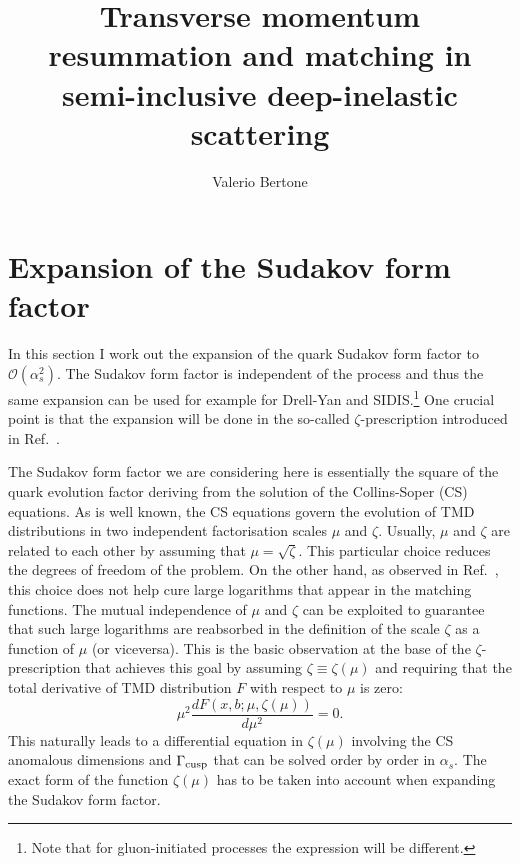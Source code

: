 \documentclass[10pt,a4paper]{article}
\begin{document}
\title{Transverse momentum resummation and matching in semi-inclusive
  deep-inelastic scattering}

\author{Valerio Bertone}

\maketitle

\printindex

\section{Expansion of the Sudakov form factor}

In this section I work out the expansion of the quark Sudakov form
factor to $\mathcal{O}(\alpha_s^2)$. The Sudakov form factor is
independent of the process and thus the same expansion can be used for
example for Drell-Yan and SIDIS.\footnote{Note that for
  gluon-initiated processes the expression will be different.} One
crucial point is that the expansion will be done in the so-called
$\zeta$-prescription introduced in Ref.~\cite{Scimemi:2017etj}.

The Sudakov form factor we are considering here is essentially the
square of the quark evolution factor deriving from the solution of the
Collins-Soper (CS) equations. As is well known, the CS equations
govern the evolution of TMD distributions in two independent
factorisation scales $\mu$ and $\zeta$. Usually, $\mu$ and $\zeta$ are
related to each other by assuming that $\mu=\sqrt{\zeta}$. This
particular choice reduces the degrees of freedom of the problem. On
the other hand, as observed in Ref.~\cite{Scimemi:2017etj}, this
choice does not help cure large logarithms that appear in the matching
functions. The mutual independence of $\mu$ and $\zeta$ can be
exploited to guarantee that such large logarithms are reabsorbed in
the definition of the scale $\zeta$ as a function of $\mu$ (or
viceversa). This is the basic observation at the base of the
$\zeta$-prescription that achieves this goal by assuming
$\zeta\equiv\zeta(\mu)$ and requiring that the total derivative of TMD
distribution $F$ with respect to $\mu$ is zero:
\begin{equation}\label{eq:zetapresc}
\mu^2\frac{dF\left(x,b;\mu,\zeta(\mu)\right)}{d\mu^2} = 0.
\end{equation}
This naturally leads to a differential equation in $\zeta(\mu)$
involving the CS anomalous dimensions and $\Gamma_{\rm cusp}$ that can
be solved order by order in $\alpha_s$. The exact form of the function
$\zeta(\mu)$ has to be taken into account when expanding the Sudakov
form factor.
\end{document}
